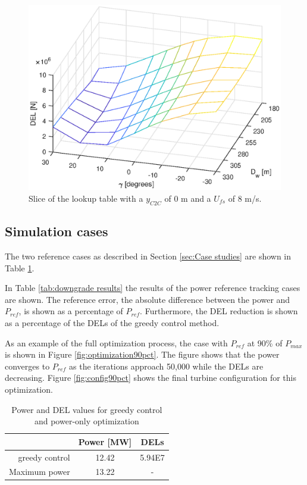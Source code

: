 \begin{figure}
	\includegraphics[width=\linewidth]{./Figures/LUTslice_yWake0_Ufs8.eps}
	\caption{Slice of the lookup table with a $y_{C2C}$ of 0 m and a $U_{fs}$ of 8 m/s. }
	\label{fig:LUTsliceDw}
\end{figure}

\subsection{Simulation cases} \label{sec:Simulation cases}
The two reference cases as described in Section \ref{sec:Case studies} are shown in Table \ref{tab:reference results}. 

In Table \ref{tab:downgrade results} the results of the power reference tracking cases are shown. The reference error, the absolute difference between the power and $P_{ref}$, is shown as a percentage of $P_{ref}$. Furthermore, the DEL reduction is shown as a percentage of the DELs of the greedy control method. 

As an example of the full optimization process, the case with $P_{ref}$ at 90\% of $P_{max}$ is shown in Figure \ref{fig:optimization90pct}. The figure shows that the power converges to $P_{ref}$ as the iterations approach 50,000 while the DELs are decreasing. Figure \ref{fig:config90pct} shows the final turbine configuration for this optimization. 

\begin{table}[p]
	\caption{Power and DEL values for greedy control and power-only optimization}
	\centering
	\label{tab:reference results}
	\begin{tabular}{rcc}
		\hline
		& Power [MW] & DELs \\ 
		\hline
		greedy control & 12.42 & 5.94E7 \\
		Maximum power & 13.22 & - \\
		\hline
	\end{tabular}
\end{table}

